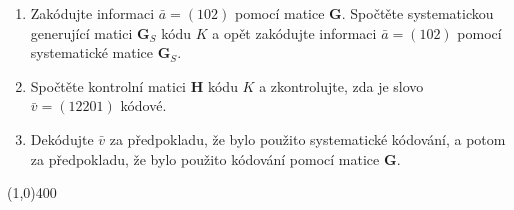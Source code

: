 \documentclass{article}
\begin{document}
\renewcommand{\labelenumi}{\alph{enumi})}

\begin{enumerate}
	\item Zakódujte informaci $\bar{a} = (102)$ pomocí matice $\mathbf{G}$. Spočtěte systematickou generující matici $\mathbf{G}_S$ kódu $K$ a opět zakódujte informaci $\bar{a} = (102)$ pomocí systematické matice $\mathbf{G}_S$.
	\item Spočtěte kontrolní matici $\mathbf{H}$ kódu $K$ a zkontrolujte, zda je slovo $\bar{v} = (12201)$ kódové.
	\item Dekódujte $\bar{v}$ za předpokladu, že bylo použito systematické kódování, a potom za předpokladu, že bylo použito kódování pomocí matice $\mathbf{G}$.
\end{enumerate}

\line(1,0){400}
\end{document}
